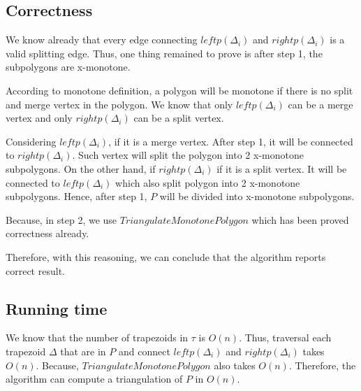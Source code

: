 \documentclass[12pt]{article}
\begin{document}
\subsection*{Correctness}
We know already that every edge connecting $leftp(\Delta_i)$ and $rightp(\Delta_i)$
is a valid splitting edge. Thus, one thing remained to prove is
after step 1, the subpolygons are x-monotone.


According to monotone definition, a polygon will be monotone if there is no
split and merge vertex in the polygon. We know that only $leftp(\Delta_i)$ can be
a merge vertex and only $rightp(\Delta_i)$ can be a split vertex.

Considering $leftp(\Delta_i)$, if it is a merge vertex. After step 1, it will be
connected to $rightp(\Delta_i)$. Such vertex will split the polygon into 2 x-monotone
subpolygons. On the other hand, if $rightp(\Delta_i)$ if it is a split vertex.
It will be connected to $leftp(\Delta_{i})$ which also split polygon into 2 x-monotone
subpolygons. Hence, after step 1, $P$ will be divided into x-monotone subpolygons.

Because, in step 2, we use $TriangulateMonotonePolygon$ which has been proved correctness already.

Therefore, with this reasoning, we can conclude that the algorithm reports correct result.

\subsection*{Running time}
We know that the number of trapezoids in $\tau$ is $O(n)$. Thus, traversal each trapezoid $\Delta$ that
are in $P$ and connect $leftp(\Delta_i)$ and $rightp(\Delta_i)$ takes $O(n)$. Because,
$TriangulateMonotonePolygon$ also takes $O(n)$. Therefore, the algorithm can compute
a triangulation of $P$ in $O(n)$.
\end{document}
